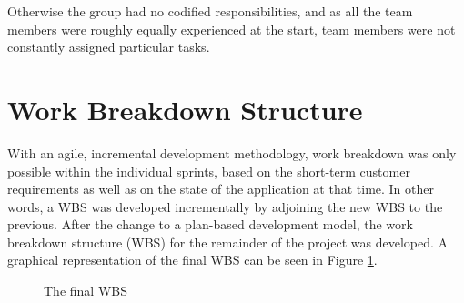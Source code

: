 Otherwise the group had no codified responsibilities, and as all the team members were roughly equally experienced at the start, team members were not constantly assigned particular tasks.
 
\section{Work Breakdown Structure}
With an agile, incremental development methodology, work breakdown was only possible within the individual sprints, based on the short-term customer requirements as well as on the state of the application at that time. In other words, a WBS was developed incrementally by adjoining the new WBS to the previous. After the change to a plan-based development model, the work breakdown structure (WBS) for the remainder of the project was developed. A graphical representation of the final WBS can be seen in Figure \ref{fig:WBS}.

\begin{figure}[p]

\setlength\fboxsep{0pt}
\setlength\fboxrule{1pt}\noindent{}

\caption{The final WBS}
\label{fig:WBS}
\end{figure}
